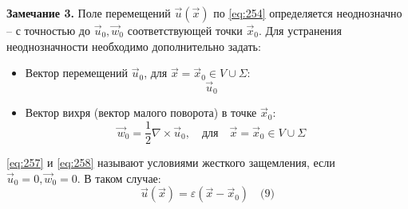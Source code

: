 \textbf{Замечание 3.} Поле перемещений \( \vec{u}(\vec{x}) \) по \ref{eq:254} определяется неоднозначно – с точностью до \( \vec{u}_0, \vec{w}_0 \) соответствующей точки \( \vec{x}_0 \). Для устранения неоднозначности необходимо дополнительно задать:
\begin{itemize}
    \item Вектор перемещений \( \vec{u}_0 \), для \( \vec{x} = \vec{x}_0 \in V \cup \Sigma \):
    \begin{equation}
    \vec{u}_0 \quad \label{eq:257}
    \end{equation}
    \item Вектор вихря (вектор малого поворота) в точке \( \vec{x}_0 \):
    \begin{equation}
    \vec{w}_0 = \frac{1}{2} \nabla \times \vec{u}_0, \quad \text{для} \quad \vec{x} = \vec{x}_0 \in V \cup \Sigma \quad \label{eq:258}
    \end{equation}
\end{itemize}
\ref{eq:257} и \ref{eq:258} называют условиями жесткого защемления, если \( \vec{u}_0 = 0, \vec{w}_0 = 0 \). В таком случае:
\begin{equation}
\vec{u}(\vec{x}) = \varepsilon (\vec{x} - \vec{x}_0) \quad \text{(9)}
\end{equation}